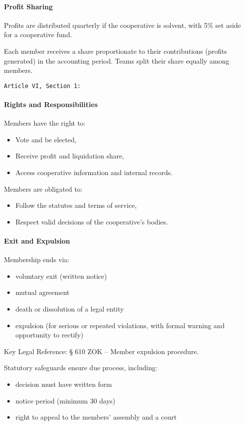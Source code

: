 \paragraph{Profit Sharing}
Profits are distributed quarterly if the cooperative is solvent, with 5\% set aside for a cooperative fund.

Each member receives a share proportionate to their contributions (profits generated) in the accounting period. Teams split their share equally among members.

\texttt{Article VI, Section 1: }
\paragraph{Rights and Responsibilities}
Members have the right to:
\begin{itemize}
    \item Vote and be elected,
    \item Receive profit and liquidation share,
    \item Access cooperative information and internal records.
\end{itemize}
Members are obligated to:
\begin{itemize}
    \item Follow the statutes and terms of service,
    \item Respect valid decisions of the cooperative’s bodies.
\end{itemize}
\paragraph{Exit and Expulsion}
Membership ends via:
\begin{itemize}
    \item voluntary exit (written notice)
    \item mutual agreement
    \item death or dissolution of a legal entity
    \item expulsion (for serious or repeated violations, with formal warning and opportunity to rectify)
\end{itemize}
Key Legal Reference: § 610 ZOK – Member expulsion procedure.

Statutory safeguards ensure due process, including:
\begin{itemize}
    \item decision must have written form
    \item notice period (minimum 30 days)
    \item right to appeal to the members’ assembly and a court
\end{itemize}
